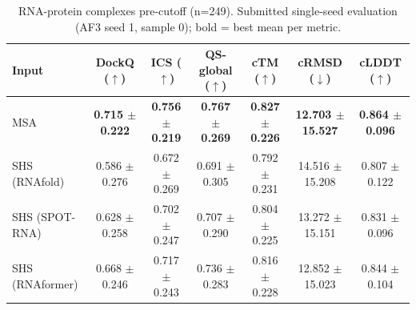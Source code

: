 \begin{table}[htbp]
\centering
\caption{RNA-protein complexes pre-cutoff (n=249). Submitted single-seed evaluation (AF3 seed 1, sample 0); bold = best mean per metric.}
\label{tab:rna_protein_complexes_pre_cutoff}
\begin{tabular}{lcccccc}
\toprule
Input & DockQ ($\uparrow$) & ICS ($\uparrow$) & QS-global ($\uparrow$) & cTM ($\uparrow$) & cRMSD ($\downarrow$) & cLDDT ($\uparrow$) \\
\midrule
MSA & \textbf{0.715 $\pm$ 0.222} & \textbf{0.756 $\pm$ 0.219} & \textbf{0.767 $\pm$ 0.269} & \textbf{0.827 $\pm$ 0.226} & \textbf{12.703 $\pm$ 15.527} & \textbf{0.864 $\pm$ 0.096} \\
SHS (RNAfold) & 0.586 $\pm$ 0.276 & 0.672 $\pm$ 0.269 & 0.691 $\pm$ 0.305 & 0.792 $\pm$ 0.231 & 14.516 $\pm$ 15.208 & 0.807 $\pm$ 0.122 \\
SHS (SPOT-RNA) & 0.628 $\pm$ 0.258 & 0.702 $\pm$ 0.247 & 0.707 $\pm$ 0.290 & 0.804 $\pm$ 0.225 & 13.272 $\pm$ 15.151 & 0.831 $\pm$ 0.096 \\
SHS (RNAformer) & 0.668 $\pm$ 0.246 & 0.717 $\pm$ 0.243 & 0.736 $\pm$ 0.283 & 0.816 $\pm$ 0.228 & 12.852 $\pm$ 15.023 & 0.844 $\pm$ 0.104 \\
\bottomrule
\end{tabular}
\end{table}
